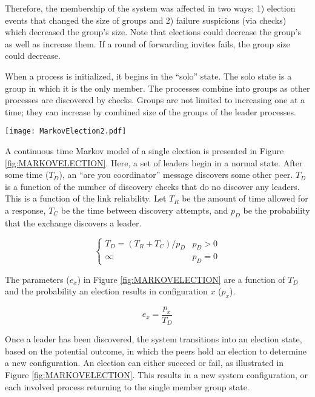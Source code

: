 Therefore, the membership of the system was affected in two ways: 1) election events that changed the size of groups and 2) failure suspicions (via checks) which decreased the group's size.
Note that elections could decrease the group's as well as increase them.
If a round of forwarding invites fails, the group size could decrease.

When a process is initialized, it begins in the ``solo'' state.
The solo state is a group in which it is the only member. 
The processes combine into groups as other processes are discovered by checks.
Groups are not limited to increasing one at a time; they can increase by combined size of the groups of the leader processes.

\begin{figure*}
\centering
\texttt{[image: MarkovElection2.pdf]}
\caption{A diagram showing a partial Markov chain for an election}
\label{fig:MARKOVELECTION}
\end{figure*}

A continuous time Markov model of a single election is presented in Figure \ref{fig:MARKOVELECTION}.
Here, a set of leaders begin in a normal state.
After some time ($T_{D}$), an ``are you coordinator'' message discovers some other peer.
$T_{D}$ is a function of the number of discovery checks that do no discover any leaders. 
This is a function of the link reliability.
Let $T_{R}$ be the amount of time allowed for a response, $T_{C}$ be the time between
discovery attempts, and $p_{D}$ be the probability that the exchange discovers a leader.

\begin{equation}
\begin{cases}
T_{D} = ( T_{R}+T_{C} ) / p_{D} & p_{D} > 0 \\
\infty & p_{D} = 0
\end{cases}
\end{equation}

The parameters ($e_x$) in Figure \ref{fig:MARKOVELECTION} are a function of $T_{D}$ and the probability an election results in configuration $x$ ($p_{x}$).

\begin{equation}
e_x = \frac{p_{x}}{T_{D}}
\end{equation}

Once a leader has been discovered, the system transitions into an election state, based on the potential outcome, in which the peers hold an election to determine a new configuration.
An election can either succeed or fail, as illustrated in Figure \ref{fig:MARKOVELECTION}. 
This results in a new system configuration, or each involved process returning to the single member group state.
 
